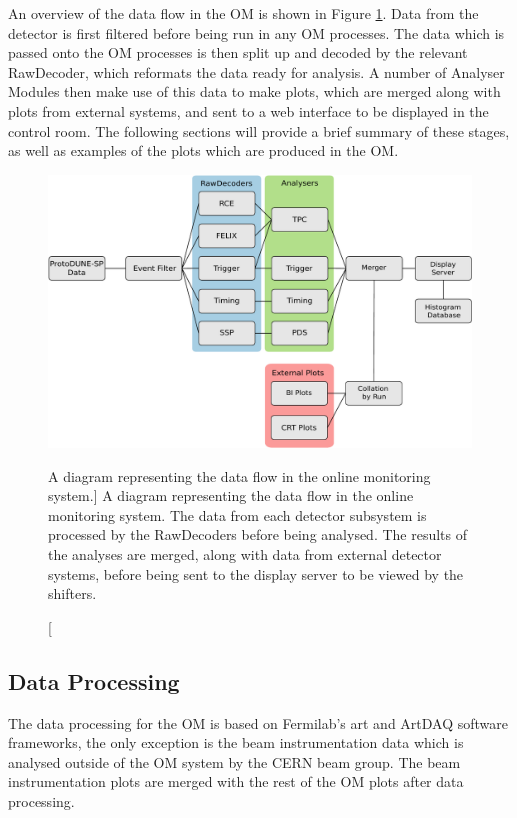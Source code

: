 An overview of the data flow in the OM is shown in Figure \ref{fig:om_flow}. 
Data from the detector is first filtered before being run in any OM processes. 
The data which is passed onto the OM processes is then split up and decoded by 
the relevant RawDecoder, which reformats the data ready for analysis. A number 
of Analyser Modules then make use of this data to make plots, which are merged 
along with plots from external systems, and sent to a web interface to be 
displayed in the control room. The following sections will provide a brief 
summary of these stages, as well as examples of the plots which are produced in
the OM.

\begin{figure}
	\centering
	\includegraphics[width=\textwidth]{figures/om_flow.pdf}
	\caption
	[A diagram representing the data flow in the \protodune{} online monitoring system.]
	{A diagram representing the data flow in the \protodune{} online monitoring
	system. The data from each detector subsystem is processed by the RawDecoders
	before being analysed. The results of the analyses are merged, along with data
	from external detector systems, before being sent to the display server to be
	viewed by the shifters.}
	\label{fig:om_flow}
\end{figure}

\subsection{Data Processing}
The data processing for the OM is based on Fermilab's art and ArtDAQ software
frameworks\cite{Green:2012gv, 6495515}, the only exception is the beam 
instrumentation data which is analysed outside of the OM system by the CERN 
beam group. The beam instrumentation plots are merged with the rest of the OM 
plots after data processing.

